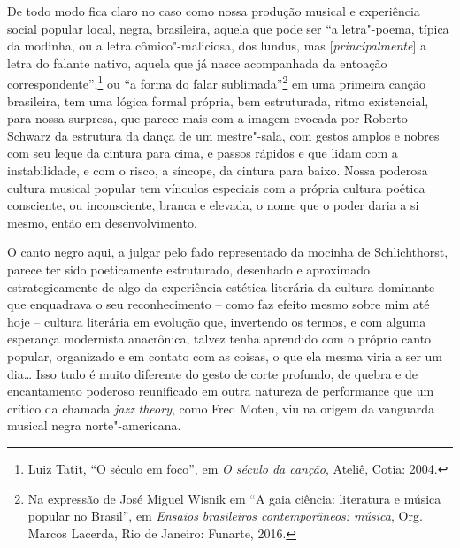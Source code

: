 De todo modo fica claro no caso como nossa produção musical e
experiência social popular local, negra, brasileira, aquela que pode ser
``a letra"-poema, típica da modinha, ou a letra cômico"-maliciosa, dos
lundus, mas {[}\emph{principalmente}{]} a letra do falante nativo,
aquela que já nasce acompanhada da entoação correspondente'',\footnote{Luiz
  Tatit, ``O século  em foco'', em \emph{O século da canção}, Ateliê,
  Cotia: 2004.} ou ``a forma do falar sublimada''\footnote{Na expressão
  de José Miguel Wisnik em ``A gaia ciência: literatura e música popular
  no Brasil'', em \emph{Ensaios brasileiros contemporâneos: música},
  Org. Marcos Lacerda, Rio de Janeiro: Funarte, 2016.} em uma primeira
canção brasileira, tem uma lógica formal própria, bem
estruturada, ritmo existencial, para nossa surpresa, que parece mais com
a imagem evocada por Roberto Schwarz da estrutura da dança de um
mestre"-sala, com gestos amplos e nobres com seu leque da cintura para
cima, e passos rápidos e que lidam com a instabilidade, e com o risco, a
síncope, da cintura para baixo. Nossa poderosa cultura musical popular
tem vínculos especiais com a própria cultura poética consciente, ou
inconsciente, branca e elevada, o nome que o poder daria a si mesmo,
então em desenvolvimento.

O canto negro aqui, a julgar pelo fado representado da mocinha de
Schlichthorst, parece ter sido poeticamente estruturado, desenhado e
aproximado estrategicamente de algo da experiência estética literária da
cultura dominante que enquadrava o seu reconhecimento -- como faz efeito
mesmo sobre mim até hoje -- cultura literária em evolução que,
invertendo os termos, e com alguma esperança modernista anacrônica,
talvez tenha aprendido com o próprio canto popular, organizado e em
contato com as coisas, o que ela mesma viria a ser um dia\ldots{} Isso tudo é
muito diferente do gesto de corte profundo, de quebra e de encantamento
poderoso reunificado em outra natureza de performance que um crítico da
chamada \emph{jazz} \emph{theory}, como Fred Moten, viu na origem da
vanguarda musical negra norte"-americana.

